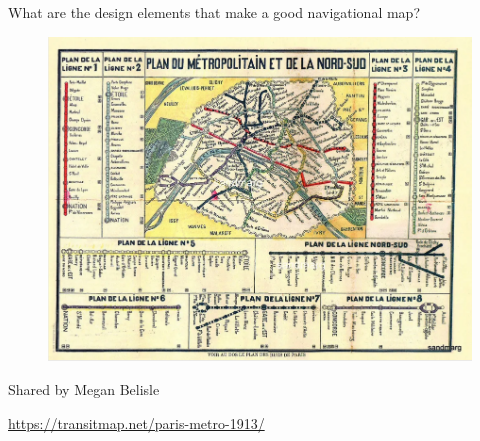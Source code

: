 \documentclass[aspectratio=169]{beamer}
\begin{document}
\begin{frame}
	
	What are the design elements that make a good navigational map?
	
\end{frame}


%	
%	
%	
%
%
%	


\begin{frame}
	
		\begin{figure}
			\centering
			\includegraphics[width=0.8\linewidth]{images/paris_1913.png}
		\end{figure}
	
		\tiny Shared by Megan Belisle
		
		\tiny \url{https://transitmap.net/paris-metro-1913/}
	
\end{frame}
\end{document}
